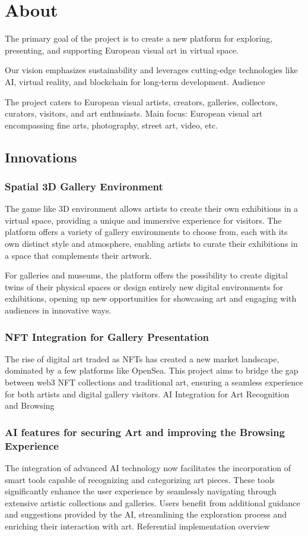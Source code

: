 \chapter{About}
The primary goal of the project is to create a new platform for exploring, presenting, and supporting European visual art in virtual space.

Our vision emphasizes sustainability and leverages cutting-edge technologies like AI, virtual reality, and blockchain for long-term development.
Audience

The project caters to European visual artists, creators, galleries, collectors, curators, visitors, and art enthusiasts. Main focus: European visual art encompassing fine arts, photography, street art, video, etc.

\section{Innovations}

\subsection[3D]{Spatial 3D Gallery Environment}
The game like 3D environment allows artists to create their own exhibitions in a virtual space, providing a unique and immersive experience for visitors. The platform offers a variety of gallery environments to choose from, each with its own distinct style and atmosphere, enabling artists to curate their exhibitions in a space that complements their artwork.

For galleries and museums, the platform offers the possibility to create digital twins of their physical spaces or design entirely new digital environments for exhibitions, opening up new opportunities for showcasing art and engaging with audiences in innovative ways.

\subsection[NFT]{NFT Integration for Gallery Presentation}
The rise of digital art traded as NFTs has created a new market landscape, dominated by a few platforms like OpenSea. This project aims to bridge the gap between web3 NFT collections and traditional art, ensuring a seamless experience for both artists and digital gallery visitors.
AI Integration for Art Recognition and Browsing

\subsection[AI]{AI features for securing Art and improving the Browsing Experience}
The integration of advanced AI technology now facilitates the incorporation of smart tools capable of recognizing and categorizing art pieces. These tools significantly enhance the user experience by seamlessly navigating through extensive artistic collections and galleries. Users benefit from additional guidance and suggestions provided by the AI, streamlining the exploration process and enriching their interaction with art.
Referential implementation overview


